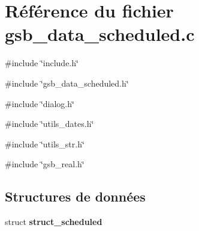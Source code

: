 \section{Référence du fichier gsb\_\-data\_\-scheduled.c}
\label{gsb__data__scheduled_8c}
{\ttfamily \#include \char`\"{}include.h\char`\"{}}\par
{\ttfamily \#include \char`\"{}gsb\_\-data\_\-scheduled.h\char`\"{}}\par
{\ttfamily \#include \char`\"{}dialog.h\char`\"{}}\par
{\ttfamily \#include \char`\"{}utils\_\-dates.h\char`\"{}}\par
{\ttfamily \#include \char`\"{}utils\_\-str.h\char`\"{}}\par
{\ttfamily \#include \char`\"{}gsb\_\-real.h\char`\"{}}\par
\subsection*{Structures de données}
\begin{DoxyCompactItemize}
\item 
struct {\bf struct\_\-scheduled}
\end{DoxyCompactItemize}
